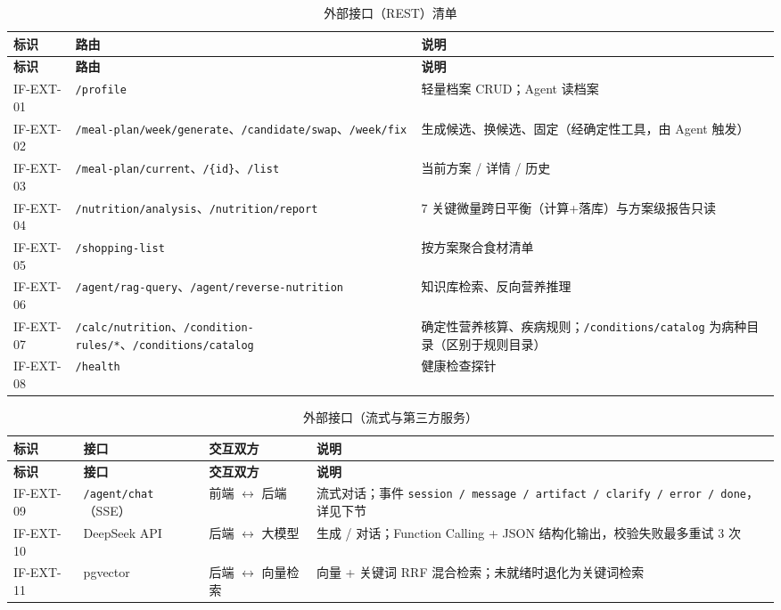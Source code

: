 \documentclass[12pt,a4paper]{ctexart}
\begin{document}
\begin{xltabular}{\linewidth}{p{2cm}p{6.2cm}L}
\caption{外部接口（REST）清单\label{tab:api}} \\
\toprule
\textbf{标识} & \textbf{路由} & \textbf{说明} \\
\midrule
\endfirsthead
\toprule
\textbf{标识} & \textbf{路由} & \textbf{说明} \\
\midrule
\endhead
IF-EXT-01 & \texttt{/profile} & 轻量档案 CRUD；Agent 读档案 \\
IF-EXT-02 & \texttt{/meal-plan/week/generate}、\texttt{/candidate/swap}、\texttt{/week/fix} & 生成候选、换候选、固定（经确定性工具，由 Agent 触发） \\
IF-EXT-03 & \texttt{/meal-plan/current}、\texttt{/\{id\}}、\texttt{/list} & 当前方案 / 详情 / 历史 \\
IF-EXT-04 & \texttt{/nutrition/analysis}、\texttt{/nutrition/report} & 7 关键微量跨日平衡（计算+落库）与方案级报告只读 \\
IF-EXT-05 & \texttt{/shopping-list} & 按方案聚合食材清单 \\
IF-EXT-06 & \texttt{/agent/rag-query}、\texttt{/agent/reverse-nutrition} & 知识库检索、反向营养推理 \\
IF-EXT-07 & \texttt{/calc/nutrition}、\texttt{/condition-rules/*}、\texttt{/conditions/catalog} & 确定性营养核算、疾病规则；\texttt{/conditions/catalog} 为病种目录（区别于规则目录） \\
IF-EXT-08 & \texttt{/health} & 健康检查探针 \\
\bottomrule
\end{xltabular}

\begin{xltabular}{\linewidth}{p{2cm}p{2.6cm}p{3.2cm}L}
\caption{外部接口（流式与第三方服务）\label{tab:ext}} \\
\toprule
\textbf{标识} & \textbf{接口} & \textbf{交互双方} & \textbf{说明} \\
\midrule
\endfirsthead
\toprule
\textbf{标识} & \textbf{接口} & \textbf{交互双方} & \textbf{说明} \\
\midrule
\endhead
IF-EXT-09 & \texttt{/agent/chat}（SSE） & 前端 $\leftrightarrow$ 后端 & 流式对话；事件 \texttt{session / message / artifact / clarify / error / done}，详见下节 \\
IF-EXT-10 & DeepSeek API & 后端 $\leftrightarrow$ 大模型 & 生成 / 对话；Function Calling + JSON 结构化输出，校验失败最多重试 3 次 \\
IF-EXT-11 & pgvector & 后端 $\leftrightarrow$ 向量检索 & 向量 + 关键词 RRF 混合检索；未就绪时退化为关键词检索 \\
\bottomrule
\end{xltabular}
\end{document}
